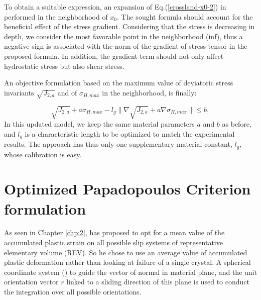 To obtain a suitable expression, an expansion of Eq.(\ref{crossland-x0-2}) in performed in the neighborhood of ${x_0}$. The sought formula should account for the beneficial effect of the stress gradient. Considering that the stress is decreasing in depth, we consider the most favorable point in the neighborhood (inf), thus a negative sign is associated with the norm of the gradient of stress tensor in the proposed formula. In addition, the gradient term should not only affect hydrostatic stress but also shear stress.

An objective formulation based on the maximum value of deviatoric stress invariants $\sqrt{J_{2,a}}$ and of $\sigma_{H,max}$ in the neighborhood, is finally:

\begin{equation}
	\sqrt{J_{2,a}}+a\sigma_{H,max}-l_g\parallel{\nabla\sqrt{J_{2,a}}}+a\nabla{\sigma_{H,max}}\parallel\leqslant b ,
	\label{modified Crossland}
\end{equation}
In this updated model, we keep the same material parameters $a$ and $b$ as before, and $l_g$ is a characteristic length to be optimized to match the experimental results. The approach has thus only one supplementary material constant, $l_g$, whose calibration is easy.

\section{Optimized Papadopoulos Criterion formulation}
As seen in Chapter \ref{chp:2},  \cite{papadopoulos1993fatigue} has proposed to opt for a mean value of the accumulated plastic strain on all possible slip systems of representative elementary volume (REV). So he chose to use an average value  of accumulated plastic deformation rather than looking at failure of a single crystal. A spherical coordinate system () to guide the vector of normal in material plane, and the unit orientation vector $r$ linked to a sliding direction of this plane is used to conduct the integration over all possible orientations.

